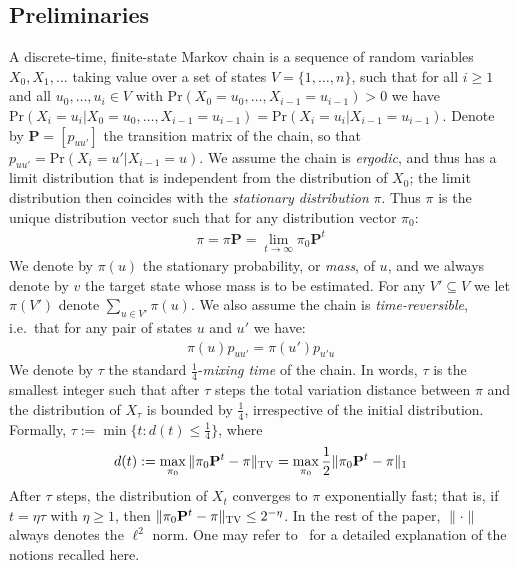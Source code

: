 \documentclass[a4paper,11pt]{article}
\newcommand{\bfP}{\mathbf{P}}
\newcommand{\prob}{\text{Pr}}
\newcommand{\tvd}[2]{\| {#1 - #2} \|_\textsc{TV}}
\begin{document}
\subsection{Preliminaries}
\label{sub:notation}
A discrete-time, finite-state Markov chain is a sequence of random variables $X_0,X_1,\ldots$ taking value over a set of states $V = \{1, \ldots, n\}$, such that for all $i\ge 1$ and all $u_0,\ldots,u_i \in V$ with $\prob(X_0 = u_0, \ldots, X_{i-1} = u_{i-1}) > 0$ we have $\prob(X_i = u_i | X_0 = u_0, \ldots, X_{i-1} = u_{i-1}) = \prob(X_i = u_i | X_{i-1} = u_{i-1})$.
Denote by $\bfP = [p_{uu'}]$ the transition matrix of the chain, so that $p_{uu'} = \prob(X_{i} = u' | X_{i-1} = u)$.
We assume the chain is \emph{ergodic}, and thus has a limit distribution that is independent from the distribution of $X_0$; the limit distribution then coincides with the \emph{stationary distribution} $\pi$.
Thus $\pi$ is the unique distribution vector such that for any distribution vector $\pi_0$:
\begin{align}
\pi = \pi \bfP = \lim_{t \to \infty} \pi_0\bfP^t
\end{align}
We denote by $\pi(u)$ the stationary probability, or \emph{mass}, of $u$, and we always denote by $v$ the target state whose mass is to be estimated. For any $V' \subseteq V$ we let $\pi(V')$ denote $\sum_{u \in V'} \pi(u)$.
We also assume the chain is \emph{time-reversible}, i.e.\ that for any pair of states $u$ and $u'$ we have:
\begin{align}
\label{eqn:detbalance}
\pi(u) p_{uu'} = \pi(u') p_{u'u}
\end{align}
We denote by $\tau$ the standard $\frac{1}{4}$-\emph{mixing time} of the chain.
In words, $\tau$ is the smallest integer such that after $\tau$ steps the total variation distance between $\pi$ and the distribution of $X_{\tau}$ is bounded by $\frac{1}{4}$, irrespective of the initial distribution.
Formally,
$\tau := \min\{t : d(t) \le \frac{1}{4}\}$,
where
\begin{align}
d(t) := \max_{\pi_0} \tvd{\pi_0 {\bfP}^t}{\pi} = \max_{\pi_0} \frac{1}{2} \|\pi_0 {\bfP}^t - {\pi}\|_1
\end{align}
After $\tau$ steps, the distribution of $X_t$ converges to $\pi$ exponentially fast; that is, if $t = \eta \tau$ with $\eta \ge 1$, then $\tvd{\pi_0 {\bfP}^t}{\pi} \le 2^{-\eta}$.
In the rest of the paper, $\|\cdot\|$ always denotes the $\ell^2$ norm.
One may refer to~\cite{Levin&2006} for a detailed explanation of the notions recalled here.
\end{document}
